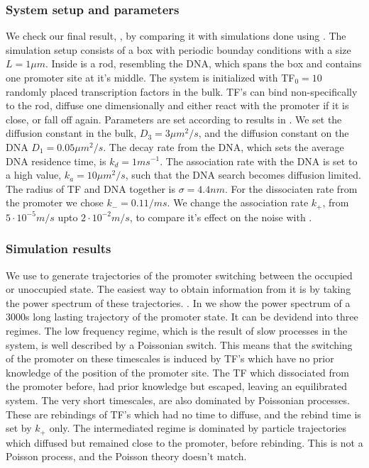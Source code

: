 \subsubsection{System setup and parameters}
We check our final result, , by comparing it with simulations done using \GFRD. The simulation setup consists of a box with periodic bounday conditions with a size $L=1\mu m$. Inside is a rod, resembling the DNA, which spans the box and contains one promoter site at it's middle. The system is initialized with TF$_0=10$ randomly placed transcription factors in the bulk. TF's can bind non-specifically to the rod, diffuse one dimensionally and either react with the promoter if it is close, or fall off again. Parameters are set according to results in \cite{Elf2007a}. We set the diffusion constant in the bulk, $D_3=3 \mu m^2/s$, and the diffusion constant on the DNA $D_1=0.05 \mu m^2/s$. The decay rate from the DNA, which sets the average DNA residence time, is $k_d=1ms^{-1}$. The association rate with the DNA is set to a high value, $k_a=10\mu m^2/s$, such that the DNA search becomes diffusion limited. The radius of TF and DNA together is $\sigma=4.4nm$. For the dissociaten rate from the promoter we chose $k_-=0.1 1/ms$. We change the association rate $k_+$, from $5\cdot10^{-5} m/s$ upto $2\cdot10^{-2} m/s$, to compare it's effect on the noise with . 

\subsubsection{Simulation results}
We use \GFRD to generate trajectories of the promoter switching between the occupied or unoccupied state. The easiest way to obtain information from it is by taking the power spectrum of these trajectories. \cite{Tkacik2009,VanZon2006}. In  we show the power spectrum of a 3000s long lasting trajectory of the promoter state. It can be devidend into three regimes. The low frequency regime, which is the result of slow processes in the system, is well described by a Poissonian switch. This means that the switching of the promoter on these timescales is induced by TF's which have no prior knowledge of the position of the promoter site. The TF which dissociated from the promoter before, had prior knowledge but escaped, leaving an equilibrated system. The very short timescales, are also dominated by Poissonian processes. These are rebindings of TF's which had no time to diffuse, and the rebind time is set by $k_+$ only. The intermediated regime is dominated by particle trajectories which diffused but remained close to the promoter, before rebinding. This is not a Poisson process, and the Poisson theory doesn't match.

